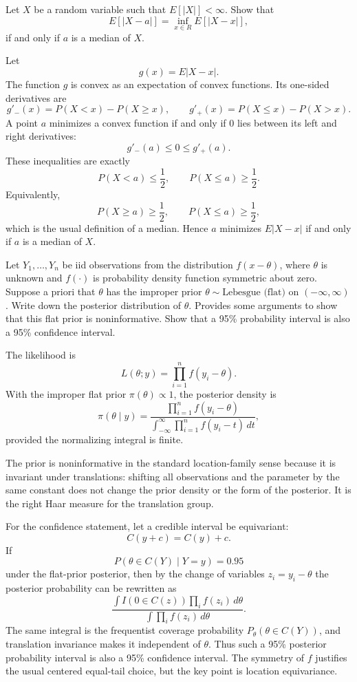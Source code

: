 \begin{exercise}
\label{applied:2011:10}
Let $X$ be a random variable such that $E [ | X | ] < \infty$. Show that
\[
E [ | X - a | ] = \inf  _ {x \in R} E [ | X - x | ],
\]
if and only if $a$ is a median of $X$.
\end{exercise}

\begin{solution}
Let
\[
g(x)=E|X-x|.
\]
The function $g$ is convex as an expectation of convex functions.  Its one-sided derivatives are
\[
g'_-(x)=P(X<x)-P(X\geq x),
\qquad
g'_+(x)=P(X\leq x)-P(X>x).
\]
A point $a$ minimizes a convex function if and only if $0$ lies between its left and right derivatives:
\[
g'_-(a)\leq0\leq g'_+(a).
\]
These inequalities are exactly
\[
P(X<a)\leq \frac12,\qquad P(X\leq a)\geq \frac12.
\]
Equivalently,
\[
P(X\geq a)\geq \frac12,\qquad P(X\leq a)\geq \frac12,
\]
which is the usual definition of a median.  Hence $a$ minimizes $E|X-x|$ if and only if $a$ is a median of $X$.
\end{solution}

\begin{exercise}
\label{applied:2011:11}
Let $Y _ { 1 } , \dots , Y _ { n }$ be iid observations from the distribution $f ( x - \theta )$, where $\theta$ is unknown and $f ( \cdot )$ is probability density function symmetric about zero.
Suppose a priori that $\theta$ has the improper prior $\theta \sim \text{Lebesgue (flat)}$ on $( - \infty , \infty )$. Write down the posterior distribution of $\theta$. Provides some arguments to show that this flat prior is noninformative. Show that a 95\% probability interval is also a 95\% confidence interval.
\end{exercise}

\begin{solution}
The likelihood is
\[
L(\theta;y)=\prod_{i=1}^n f(y_i-\theta).
\]
With the improper flat prior $\pi(\theta)\propto1$, the posterior density is
\[
\pi(\theta\mid y)=
\frac{\prod_{i=1}^n f(y_i-\theta)}
{\int_{-\infty}^{\infty}\prod_{i=1}^n f(y_i-t)\,dt},
\]
provided the normalizing integral is finite.

The prior is noninformative in the standard location-family sense because it is invariant under translations: shifting all observations and the parameter by the same constant does not change the prior density or the form of the posterior.  It is the right Haar measure for the translation group.

For the confidence statement, let a credible interval be equivariant:
\[
C(y+c)=C(y)+c.
\]
If
\[
P(\theta\in C(Y)\mid Y=y)=0.95
\]
under the flat-prior posterior, then by the change of variables $z_i=y_i-\theta$ the posterior probability can be rewritten as
\[
\frac{\int I(0\in C(z))\prod_i f(z_i)\,d\theta}
{\int \prod_i f(z_i)\,d\theta}.
\]
The same integral is the frequentist coverage probability $P_\theta(\theta\in C(Y))$, and translation invariance makes it independent of $\theta$.  Thus such a 95\% posterior probability interval is also a 95\% confidence interval.  The symmetry of $f$ justifies the usual centered equal-tail choice, but the key point is location equivariance.
\end{solution}

